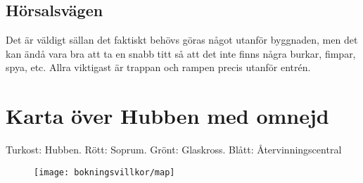 \subsection{Hörsalsvägen}
Det är väldigt sällan det faktiskt behövs göras något utanför byggnaden, men det kan ändå vara bra att ta en snabb titt så att det inte finns några burkar, fimpar, spya, etc. Allra viktigast är trappan och rampen precis utanför entrén.

\newpage
\section{Karta över Hubben med omnejd}
Turkost: Hubben. Rött: Soprum. Grönt: Glaskross. Blått: Återvinningscentral
\begin{figure}[h]
    \centering
    \texttt{[image: bokningsvillkor/map]}
    \label{fig:map}
\end{figure}